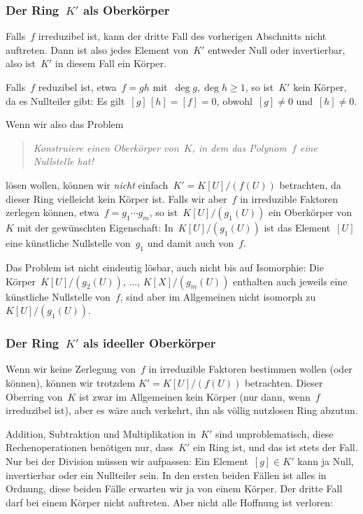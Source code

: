 \documentclass{../../alg2/algblatt}
\begin{document}
\subsubsection*{Der Ring~$K'$ als Oberkörper}

Falls~$f$ irreduzibel ist, kann der dritte Fall des vorherigen Abschnitts nicht
auftreten. Dann ist also jedes Element von~$K'$ entweder Null oder
invertierbar, also ist~$K'$ in diesem Fall ein Körper.

Falls~$f$ reduzibel ist, etwa~$f = gh$ mit~$\deg g, \deg h \geq 1$, so ist~$K'$
kein Körper, da es Nullteiler gibt: Es gilt~$[g]\,[h] = [f] = 0$, obwohl~$[g]
\neq 0$ und~$[h] \neq 0$.

Wenn wir also das Problem
\begin{quote}\emph{Konstruiere einen Oberkörper von~$K$, in dem das Polynom~$f$
eine Nullstelle hat!}\end{quote}
lösen wollen, können wir \emph{nicht} einfach~$K' = K[U]/(f(U))$ betrachten, da
dieser Ring vielleicht kein Körper ist. Falls wir aber~$f$ in irreduzible
Faktoren zerlegen können, etwa~$f = g_1 \cdots g_m$, so ist~$K[U]/(g_1(U))$ ein
Oberkörper von~$K$ mit der gewünschten Eigenschaft: In~$K[U]/(g_1(U))$ ist das
Element~$[U]$ eine künstliche Nullstelle von~$g_1$ und damit auch von~$f$.

Das Problem ist nicht eindeutig lösbar, auch nicht bis auf Isomorphie: Die
Körper~$K[U]/(g_2(U))$, $\ldots$, $K[X]/(g_m(U))$ enthalten auch jeweils eine künstliche
Nullstelle von~$f$, sind aber im Allgemeinen nicht isomorph zu~$K[U]/(g_1(U))$.


\subsubsection*{Der Ring~$K'$ als ideeller Oberkörper}

Wenn wir keine Zerlegung von~$f$ in irreduzible Faktoren bestimmen wollen (oder
können), können wir trotzdem $K' = K[U]/(f(U))$ betrachten. Dieser Oberring
von~$K$ ist zwar im Allgemeinen kein Körper (nur dann, wenn~$f$ irreduzibel
ist), aber es wäre auch verkehrt, ihn als völlig nutzlosen Ring abzutun.

Addition, Subtraktion und Multiplikation in~$K'$ sind unproblematisch, diese
Rechenoperationen benötigen nur, dass~$K'$ ein Ring ist, und das ist stets der
Fall. Nur bei der Division müssen wir aufpassen: Ein Element~$[g] \in K'$ kann
ja Null, invertierbar oder ein Nullteiler sein. In den ersten beiden Fällen ist
alles in Ordnung, diese beiden Fälle erwarten wir ja von einem Körper. Der
dritte Fall darf bei einem Körper nicht auftreten. Aber nicht alle Hoffnung ist
verloren:
\end{document}
